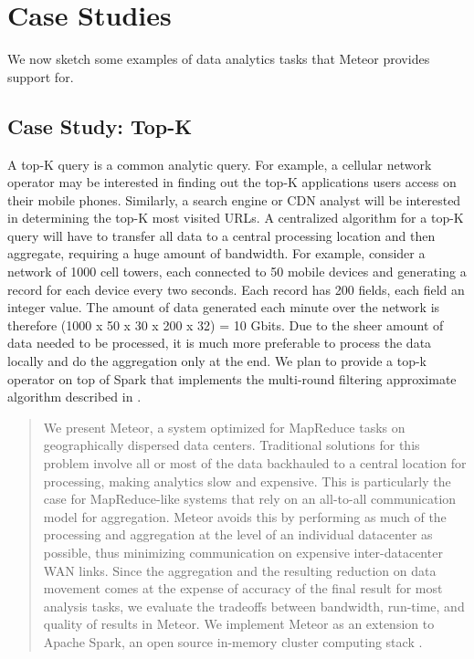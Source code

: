 \section{Case Studies}

We now sketch some examples of data analytics tasks that Meteor provides support for. 

\subsection{Case Study: Top-K}

A top-K query is a common analytic query. For example, a cellular network operator may be interested in finding out the top-K applications users access on their mobile phones. Similarly, a search engine or CDN analyst will be interested in determining the top-K most visited URLs. 
A centralized algorithm for a top-K query will have to transfer all data to a central processing location and then aggregate, requiring a huge amount of bandwidth. For example, consider a network of 1000 cell towers, each connected to 50 mobile devices and generating a record for each device every two seconds. Each record has 200 fields, each field an integer value. The amount of data generated each minute over the network is therefore (1000 x 50 x 30 x 200 x 32) = 10 Gbits. Due to the sheer amount of data needed to be processed, it is much more preferable to process the data locally and do the aggregation only at the end. We plan to provide a top-k operator on top of Spark that implements the multi-round filtering approximate algorithm described in \cite{3}.\begin{abstract}
We present Meteor, a system optimized for MapReduce tasks on geographically dispersed 
data centers. Traditional solutions for this problem involve all or most of the data backhauled to a central location for processing, making analytics slow and expensive. This is particularly the case for MapReduce-like systems that rely on an all-to-all communication model for aggregation. Meteor avoids this by performing as much of the processing and aggregation at the level of an individual datacenter as possible, thus minimizing communication on expensive inter-datacenter WAN links. Since the aggregation and the resulting reduction on data movement comes at the expense of accuracy of the final result for most analysis tasks, we evaluate the tradeoffs between bandwidth, run-time, and quality of results in Meteor. We implement Meteor as an extension to Apache Spark, an open source in-memory cluster computing stack \cite{1}. 
\end{abstract}


